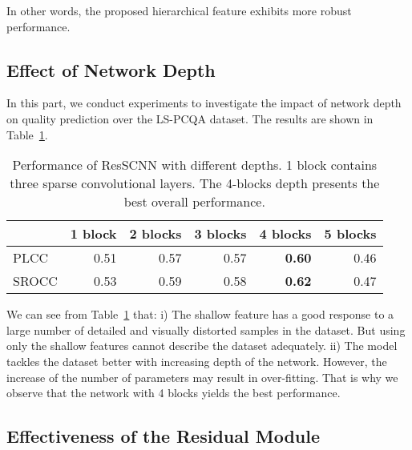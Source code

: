 \documentclass[acmsmall]{acmart}
\begin{document}
\par In other words, the proposed hierarchical feature exhibits more robust performance.

\subsection{Effect of Network Depth}

\par In this part, we conduct experiments to investigate the impact of network depth on quality prediction over the LS-PCQA dataset. The results are shown in Table~\ref{networkdepth}.

\begin{table}[htbp]
  \centering
  \caption{Performance of ResSCNN with different depths. 1 block contains three sparse convolutional layers. The 4-blocks depth presents the best overall performance.}
  \begin{footnotesize}
    \begin{tabular}{l|r|r|r|r|r}
    \hline
          & \multicolumn{1}{l|}{1 block} & \multicolumn{1}{l|}{2 blocks} & \multicolumn{1}{l|}{3 blocks} & \multicolumn{1}{l|}{4 blocks} & \multicolumn{1}{l}{5 blocks} \\
    \hline
    PLCC  & 0.51  &  0.57     &   0.57    & \textbf{0.60}  & 0.46 \\
    SROCC & 0.53  &  0.59     &   0.58    & \textbf{0.62}  & 0.47 \\
    \hline
    \end{tabular}\end{footnotesize}
  \label{networkdepth}\end{table}


\par We can see from Table~\ref{networkdepth} that: i) The shallow feature has a good response to a large number of detailed and visually distorted samples in the dataset. But using only the shallow features cannot describe the dataset adequately. ii) The model tackles the dataset better with increasing depth of the network. However, the increase of the number of parameters may result in over-fitting. That is why we observe that the network with 4 blocks yields the best performance.

\subsection{Effectiveness of the Residual Module}
\end{document}
